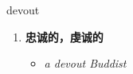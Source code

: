 
\begin{frame}
{\huge devout}
\begin{center}
\begin{enumerate}\Large
  \item \textbf{忠诚的，虔诚的}
  \begin{itemize}
    \item \em{\Large{a devout Buddist}}
  \end{itemize}
\end{enumerate}
\end{center}
\end{frame}
